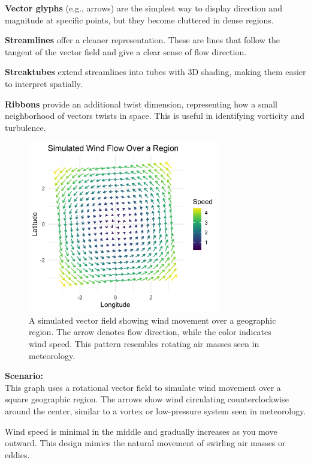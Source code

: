 \documentclass[11pt]{article}
\begin{document}
\textbf{Vector glyphs} (e.g., arrows) are the simplest way to display direction and magnitude at specific points, but they become cluttered in dense regions.
	
\textbf{Streamlines} offer a cleaner representation. These are lines that follow the tangent of the vector field and give a clear sense of flow direction.
	
\textbf{Streaktubes} extend streamlines into tubes with 3D shading, making them easier to interpret spatially.
	
\textbf{Ribbons} provide an additional twist dimension, representing how a small neighborhood of vectors twists in space. This is useful in identifying vorticity and turbulence.
	
\vspace{4em}
	
\begin{figure}[H]
	\centering
	\includegraphics[width=0.75\textwidth]
	{simulated_wind_over_region.png}
	\caption{A simulated vector field showing wind movement over a geographic region. The arrow denotes flow direction, while the color indicates wind speed. This pattern resembles rotating air masses seen in meteorology.}
	\label{fig:wind_vector_field}
\end{figure}

\noindent
\textbf{Scenario:} \\
This graph uses a rotational vector field to simulate wind movement over a square geographic region.  The arrows show wind circulating counterclockwise around the center, similar to a vortex or low-pressure system seen in meteorology.

Wind speed is minimal in the middle and gradually increases as you move outward. This design mimics the natural movement of swirling air masses or eddies.
\end{document}
